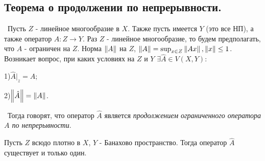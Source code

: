 \subsection*{Теорема о продолжении по непрерывности.}

\noindent\textbullet~Пусть $Z$ - линейное многообразие в $X$. Также пусть имеется $Y$ (это все НП), а также оператор $A : Z \to Y$. Раз $Z$ - линейное многообразие, то будем предполагать, что $A$ - ограничен на $Z$. Норма $\left\lVert A\right\rVert$ на $Z$, $\left\lVert A\right\rVert = \sup_{x \in Z} \left\lVert A x\right\rVert, \left\lVert x\right\rVert \le 1$. Возникает 
вопрос, при каких условиях на $Z$ и $Y$ $\exists \hat{A} \in V(X, Y) : $

1)$\hat{A} \big|_z = A$;

2)$\left\lVert\hat{A}\right\rVert = \left\lVert A\right\rVert$. 

\noindent\textasteriskcentered~Тогда говорят, что оператор $\hat{A}$ является \textit{продолжением ограниченного оператора $A$ по непрерывности}. 

\medskip
\begin{theorem*}
Пусть $Z$ всюдо плотно в $X$, $Y$ - Банахово пространство. Тогда оператор $\hat{A}$ существует и только один. 
\end{theorem*}

